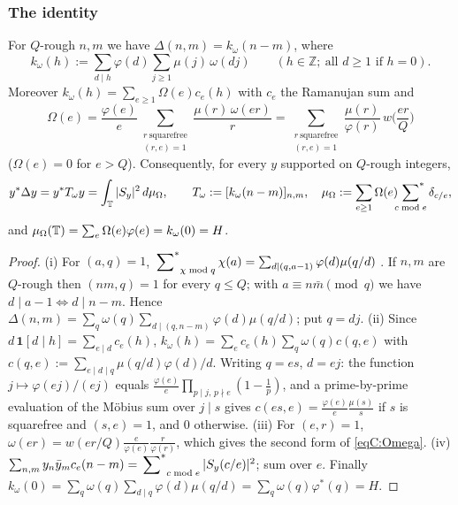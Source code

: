 \subsubsection*{The identity}

\begin{lemma}\label{lem:toeplitz}
For $Q$-rough $n,m$ we have $\Delta(n,m)=k_\omega(n-m)$, where
\[
 k_\omega(h):=\sum_{d\mid h}\varphi(d)\sum_{j\ge1}\mu(j)\,\omega(dj)\qquad(h\in\mathbb Z;\ \text{all }d\ge1\text{ if }h=0).
\]
Moreover $k_\omega(h)=\sum_{e\ge1}\Omega(e)c_e(h)$ with $c_e$ the Ramanujan sum and
\begin{equation}\label{eqC:Omega}
 \Omega(e)=\frac{\varphi(e)}e\sum_{\substack{r\ \mathrm{squarefree}\\(r,e)=1}}\frac{\mu(r)\,\omega(er)}r
 =\sum_{\substack{r\ \mathrm{squarefree}\\(r,e)=1}}\frac{\mu(r)}{\varphi(r)}\,w\Big(\frac{er}Q\Big)
\end{equation}
($\Omega(e)=0$ for $e>Q$). Consequently, for every $y$ supported on $Q$-rough integers,
\begin{equation}\label{eqC:farey}
 y^*\Delta y=y^*T_\omega y=\int_{\mathbb{T}}|S_y|^2\,d\mu_\Omega,\qquad T_\omega:=[k_\omega(n-m)]_{n,m},\quad
 \mu_\Omega:=\sum_{e\ge1}\Omega(e)\sideset{}{^*}\sum_{c\bmod e}\delta_{c/e},
\end{equation}
and $\mu_\Omega(\mathbb{T})=\sum_e\Omega(e)\varphi(e)=k_\omega(0)=H$.
\end{lemma}

\begin{proof}
(i) For $(a,q)=1$, $\sideset{}{^*}\sum_{\chi\bmod q}\chi(a)=\sum_{d\mid(q,a-1)}\varphi(d)\mu(q/d)$ \cite[(3.9)]{IK04}. If $n,m$ are $Q$-rough
then $(nm,q)=1$ for every $q\le Q$; with $a\equiv n\bar m\pmod q$ we have $d\mid a-1\iff d\mid n-m$. Hence
$\Delta(n,m)=\sum_q\omega(q)\sum_{d\mid(q,n-m)}\varphi(d)\mu(q/d)$; put $q=dj$.
(ii) Since $d\,\mathbf 1[d\mid h]=\sum_{e\mid d}c_e(h)$, $k_\omega(h)=\sum_{e}c_e(h)\sum_{q}\omega(q)c(q,e)$ with
$c(q,e):=\sum_{e\mid d\mid q}\mu(q/d)\varphi(d)/d$. Writing $q=es$, $d=ej$: the function $j\mapsto\varphi(ej)/(ej)$ equals
$\frac{\varphi(e)}e\prod_{p\mid j,\,p\nmid e}(1-\frac1p)$, and a prime-by-prime evaluation of the M\"obius sum over $j\mid s$
gives $c(es,e)=\frac{\varphi(e)}e\frac{\mu(s)}s$ if $s$ is squarefree and $(s,e)=1$, and $0$ otherwise.
(iii) For $(e,r)=1$, $\omega(er)=w(er/Q)\frac e{\varphi(e)}\frac r{\varphi(r)}$, which gives the second form of \eqref{eqC:Omega}.
(iv) $\sum_{n,m}y_n\bar y_mc_e(n-m)=\sideset{}{^*}\sum_{c\bmod e}|S_y(c/e)|^2$; sum over $e$. Finally $k_\omega(0)=\sum_q\omega(q)
\sum_{d\mid q}\varphi(d)\mu(q/d)=\sum_q\omega(q)\varphi^*(q)=H$.
\end{proof}

